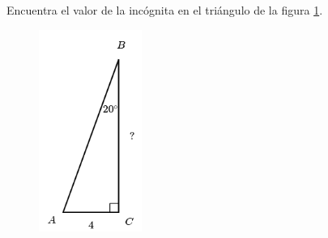 Encuentra el valor de la incógnita en el triángulo de la figura \ref{fig:lados_functrig_29}.
\begin{figure}[H]
    \begin{center}
        \includegraphics[width=0.3\textwidth]{../images/lados_functrig_29.png}
    \end{center}
    \caption{}
    \label{fig:lados_functrig_29}
\end{figure}